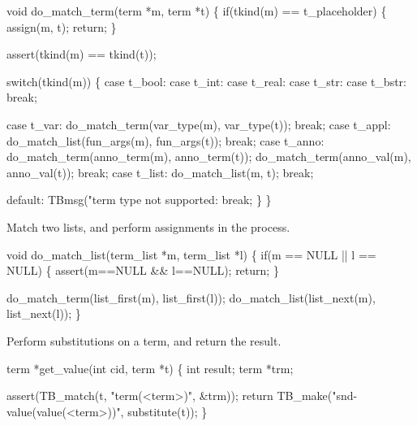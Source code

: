void do_match_term(term *m, term *t)
\{
  if(tkind(m) == t_placeholder) \{
    assign(m, t);
    return;
  \}

  assert(tkind(m) == tkind(t));

  switch(tkind(m)) \{
    case t_bool:
    case t_int:
    case t_real:
    case t_str:
    case t_bstr:        break;

    case t_var:         do_match_term(var_type(m), var_type(t));
                        break;
    case t_appl:        do_match_list(fun_args(m), fun_args(t));
                        break;
    case t_anno:        do_match_term(anno_term(m), anno_term(t));
                        do_match_term(anno_val(m), anno_val(t));
                        break;
    case t_list:        do_match_list(m, t);
                        break;

    default:            TBmsg("term type not supported: %
                        break;
  \}
\}
\nwendcode{}\nwdocspar


Match two lists, and perform assignments in the process.

\nwenddocs{}\endmoddef\let\nwnotused=\nwoutput{}
void do_match_list(term_list *m, term_list *l)
\{
  if(m == NULL || l == NULL) \{
    assert(m==NULL && l==NULL);
    return;
  \}

  do_match_term(list_first(m), list_first(l));
  do_match_list(list_next(m), list_next(l));
\}
\nwendcode{}\nwdocspar



Perform substitutions on a term, and return the result.

\nwenddocs{}\endmoddef\let\nwnotused=\nwoutput{}
term *get_value(int cid, term *t)
\{
  int result;
  term *trm;

  assert(TB_match(t, "term(<term>)", &trm));
  return TB_make("snd-value(value(<term>))", substitute(t));
\}
\nwendcode{}\nwdocspar

